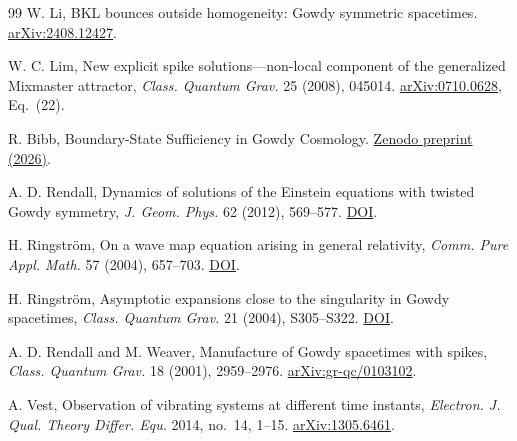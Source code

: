 \documentclass[11pt]{article}
\begin{document}
\begin{thebibliography}{99}
 W. Li,
BKL bounces outside homogeneity: Gowdy symmetric spacetimes.
\href{https://arxiv.org/abs/2408.12427}{arXiv:2408.12427}.

 W. C. Lim, New explicit spike solutions---non-local component
of the generalized Mixmaster attractor,
\emph{Class. Quantum Grav.} 25 (2008), 045014.
\href{https://arxiv.org/abs/0710.0628}{arXiv:0710.0628}, Eq.~(22).

 R. Bibb, Boundary-State Sufficiency in Gowdy Cosmology.
\href{https://doi.org/10.5281/zenodo.21959052}{Zenodo preprint (2026)}.

 A. D. Rendall,
Dynamics of solutions of the Einstein equations with twisted
Gowdy symmetry, \emph{J. Geom. Phys.} 62 (2012), 569--577.
\href{https://doi.org/10.1016/j.geomphys.2011.04.016}{DOI}.

 H. Ringstr\"om, On a wave map equation arising in
general relativity, \emph{Comm. Pure Appl. Math.} 57 (2004), 657--703.
\href{https://doi.org/10.1002/cpa.20015}{DOI}.

 H. Ringstr\"om, Asymptotic expansions close
to the singularity in Gowdy spacetimes,
\emph{Class. Quantum Grav.} 21 (2004), S305--S322.
\href{https://doi.org/10.1088/0264-9381/21/3/019}{DOI}.

 A. D. Rendall and M. Weaver,
Manufacture of Gowdy spacetimes with spikes,
\emph{Class. Quantum Grav.} 18 (2001), 2959--2976.
\href{https://arxiv.org/abs/gr-qc/0103102}{arXiv:gr-qc/0103102}.

 A. Vest, Observation of vibrating systems at different time
instants, \emph{Electron. J. Qual. Theory Differ. Equ.} 2014, no.~14, 1--15.
\href{https://arxiv.org/abs/1305.6461}{arXiv:1305.6461}.
\end{thebibliography}
\end{document}
